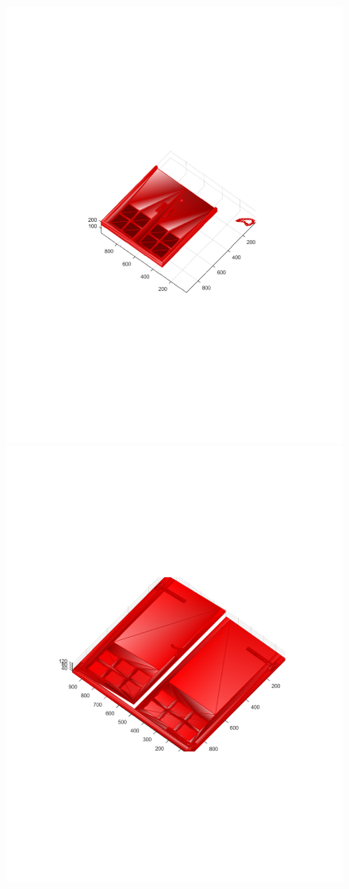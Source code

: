 \documentclass{UCF_ETD}
\begin{document}
\begin{figure}[H]
\begin{center}
\includegraphics[scale=0.34]{RobustRegistration/NoiselessAnomalies4}
\includegraphics[scale=0.34]{RobustRegistration/NoiselessAnomalies5}

\end{center}
\end{figure}
\end{document}

